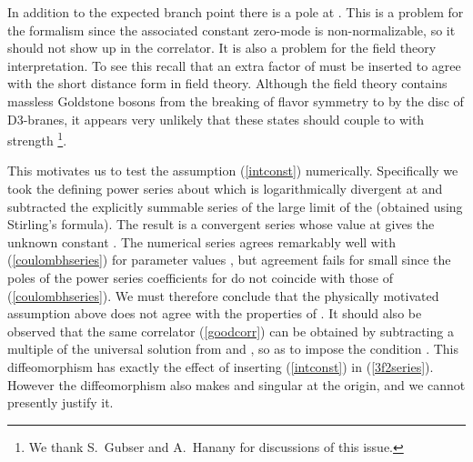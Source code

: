 \documentclass[a4paper,12pt]{article}
\def\Tr{\rm Tr\ }
\def\varphit{\tilde{\varphi}}
\begin{document}
In addition to the expected branch point there is a pole at \coordHE{}. This is a problem for the formalism since the associated constant
zero-mode is non-normalizable, so it should not show up in the
correlator. It is also a problem for the field theory
interpretation. To see this recall that an extra factor of \coordHE{} must
be inserted to agree with the short distance form \coordHE{}
in field theory. Although the field theory contains massless Goldstone
bosons from the breaking of \coordHE{} flavor symmetry to \coordHE{} by the disc of D3-branes, it appears very unlikely that these
states should couple to \myHighlight{${\cal O}_{\varphi}= {\Tr} X^2$}\coordHE{} with strength
\coordHE{}\footnote{We thank S.~Gubser and A.~Hanany for discussions of this
issue.}.


This motivates us to test the assumption (\ref{intconst}) numerically.
Specifically we took the defining power series \coordHE{}
about \coordHE{} which is logarithmically divergent at \coordHE{} and subtracted
the explicitly summable series of the large \coordHE{} limit of the \coordHE{}
(obtained using Stirling's formula). The result is a convergent series
whose value at \coordHE{} gives the unknown constant \myHighlight{${\varphit_0(a)}$}\coordHE{}. The
numerical series agrees remarkably well with (\ref{coulombhseries})
for parameter values \coordHE{}, but agreement fails for small \coordHE{} since
the poles of the power series coefficients for \coordHE{} do not
coincide with those of (\ref{coulombhseries}).  We must therefore
conclude that the physically motivated assumption above does not agree
with the properties of \coordHE{}. It should also be observed that
the same correlator (\ref{goodcorr}) can be obtained by subtracting a
multiple of the universal solution from \coordHE{} and \myHighlight{$\varphit(v)$}\coordHE{}, so as
to impose the condition \coordHE{}.
This diffeomorphism has exactly the effect of inserting
(\ref{intconst}) in (\ref{3f2series}). However the diffeomorphism also
makes \coordHE{} and \myHighlight{$\varphit(v)$}\coordHE{} singular at the origin, and we cannot
presently justify it.
\end{document}
